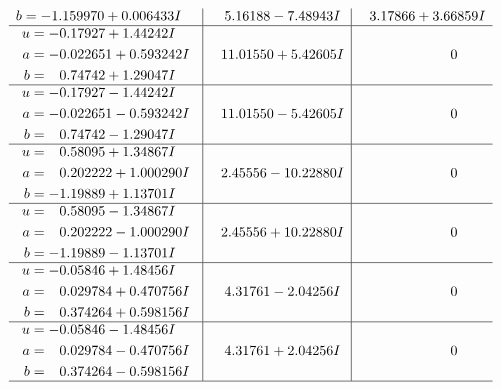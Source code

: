 \documentclass[1p]{elsarticle_modified}
\theoremstyle{definition}
\begin{document}
$$\begin{array}{c|c|c}
\begin{aligned}
b &= -1.159970 + 0.006433 I\end{aligned}
 & \phantom{-}5.16188 - 7.48943 I & \phantom{-}3.17866 + 3.66859 I \\ \hline\begin{aligned}
u &= -0.17927 + 1.44242 I \\
a &= -0.022651 + 0.593242 I \\
b &= \phantom{-}0.74742 + 1.29047 I\end{aligned}
 & \phantom{-}11.01550 + 5.42605 I & \phantom{-0.000000 } 0 \\ \hline\begin{aligned}
u &= -0.17927 - 1.44242 I \\
a &= -0.022651 - 0.593242 I \\
b &= \phantom{-}0.74742 - 1.29047 I\end{aligned}
 & \phantom{-}11.01550 - 5.42605 I & \phantom{-0.000000 } 0 \\ \hline\begin{aligned}
u &= \phantom{-}0.58095 + 1.34867 I \\
a &= \phantom{-}0.202222 + 1.000290 I \\
b &= -1.19889 + 1.13701 I\end{aligned}
 & \phantom{-}2.45556 - 10.22880 I & \phantom{-0.000000 } 0 \\ \hline\begin{aligned}
u &= \phantom{-}0.58095 - 1.34867 I \\
a &= \phantom{-}0.202222 - 1.000290 I \\
b &= -1.19889 - 1.13701 I\end{aligned}
 & \phantom{-}2.45556 + 10.22880 I & \phantom{-0.000000 } 0 \\ \hline\begin{aligned}
u &= -0.05846 + 1.48456 I \\
a &= \phantom{-}0.029784 + 0.470756 I \\
b &= \phantom{-}0.374264 + 0.598156 I\end{aligned}
 & \phantom{-}4.31761 - 2.04256 I & \phantom{-0.000000 } 0 \\ \hline\begin{aligned}
u &= -0.05846 - 1.48456 I \\
a &= \phantom{-}0.029784 - 0.470756 I \\
b &= \phantom{-}0.374264 - 0.598156 I\end{aligned}
 & \phantom{-}4.31761 + 2.04256 I & \phantom{-0.000000 } 0\\
 \hline 

\end{array}$$
\end{document}
